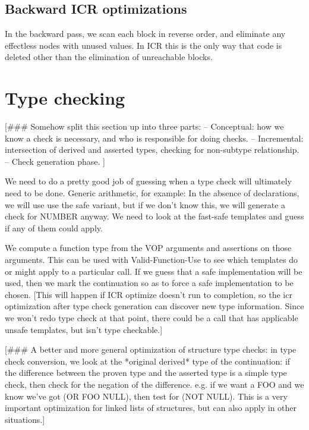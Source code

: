
\section{Backward ICR optimizations}

In the backward pass, we scan each block in reverse order, and
eliminate any effectless nodes with unused values.  In ICR this is the
only way that code is deleted other than the elimination of unreachable blocks.


\chapter{Type checking}

[\#\#\# Somehow split this section up into three parts:
 -- Conceptual: how we know a check is necessary, and who is responsible for
    doing checks.
 -- Incremental: intersection of derived and asserted types, checking for
    non-subtype relationship.
 -- Check generation phase.
]


We need to do a pretty good job of guessing when a type check will ultimately
need to be done.  Generic arithmetic, for example: In the absence of
declarations, we will use use the safe variant, but if we don't know this, we
will generate a check for NUMBER anyway.  We need to look at the fast-safe
templates and guess if any of them could apply.

We compute a function type from the VOP arguments
and assertions on those arguments.  This can be used with Valid-Function-Use
to see which templates do or might apply to a particular call.  If we guess
that a safe implementation will be used, then we mark the continuation so as to
force a safe implementation to be chosen.  [This will happen if ICR optimize
doesn't run to completion, so the icr optimization after type check generation
can discover new type information.  Since we won't redo type check at that
point, there could be a call that has applicable unsafe templates, but isn't
type checkable.]

[\#\#\# A better and more general optimization of structure type checks: in type
check conversion, we look at the *original derived* type of the continuation:
if the difference between the proven type and the asserted type is a simple
type check, then check for the negation of the difference.  e.g. if we want a
FOO and we know we've got (OR FOO NULL), then test for (NOT NULL).  This is a
very important optimization for linked lists of structures, but can also apply
in other situations.]

